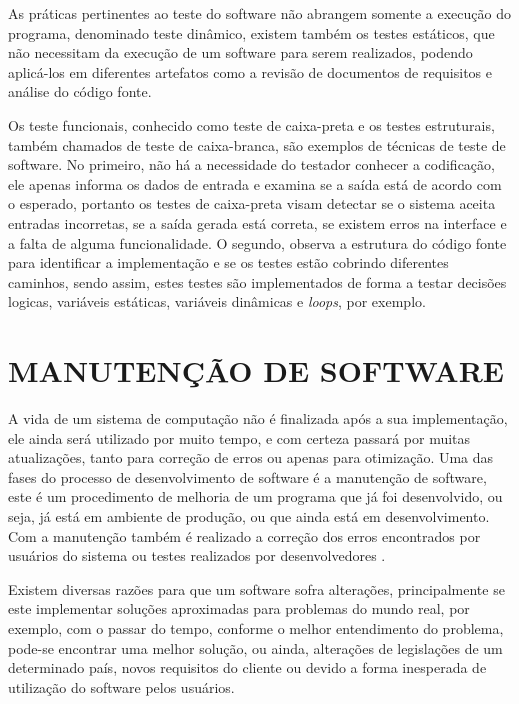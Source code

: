 As práticas pertinentes ao teste do software não abrangem somente a execução do programa, denominado teste dinâmico, existem também os testes estáticos, que não necessitam da execução de um software para serem realizados, podendo aplicá-los em diferentes artefatos como a revisão de documentos de requisitos e análise do código fonte.\cite{Pedro}

Os teste funcionais, conhecido como teste de caixa-preta e os testes estruturais, também chamados de teste de caixa-branca, são exemplos de técnicas de teste de software. No primeiro, não há a necessidade do testador conhecer a codificação, ele apenas informa os dados de entrada e examina se a saída está de acordo com o esperado, portanto os testes de caixa-preta visam detectar se o sistema aceita entradas incorretas, se a saída gerada está correta, se existem erros na interface e a falta de alguma funcionalidade. O segundo, observa a estrutura do código fonte para identificar a implementação e se os testes estão cobrindo diferentes caminhos, sendo assim, estes testes são implementados de forma a testar decisões logicas, variáveis estáticas, variáveis dinâmicas e \textit{loops}, por exemplo.\cite{Pedro}


\section{MANUTENÇÃO DE SOFTWARE}
\label{sec:manutencaoDeSoftware}

A vida de um sistema de computação não é finalizada após a sua implementação, ele ainda será utilizado por muito tempo, e com certeza passará por muitas atualizações, tanto para correção de erros ou apenas para otimização. Uma das fases do processo de desenvolvimento de software é a manutenção de software, este é um procedimento de melhoria de um programa que já foi desenvolvido, ou seja, já está em ambiente de produção, ou que ainda está em desenvolvimento. Com a manutenção também é realizado a correção dos erros encontrados por usuários do sistema ou testes realizados por desenvolvedores \cite{rodrigoSpinola2011}.

Existem diversas razões para que um software sofra alterações, principalmente se este implementar soluções aproximadas para problemas do mundo real, por exemplo, com o passar do tempo, conforme o melhor entendimento do problema, pode-se encontrar uma melhor solução, ou ainda, alterações de legislações de um determinado país, novos requisitos do cliente ou devido a forma inesperada de utilização do software pelos usuários.

